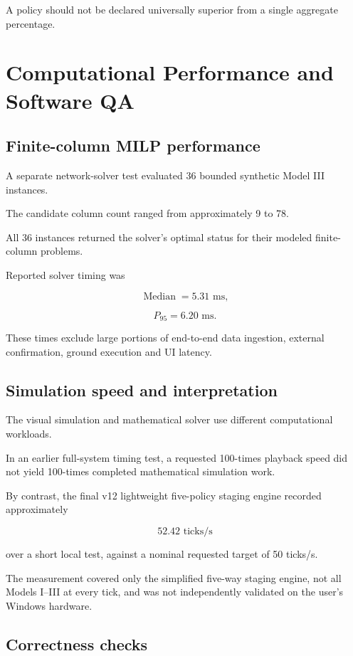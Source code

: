 \documentclass[10pt,a4paper]{article}
\theoremstyle{plain}
\theoremstyle{definition}
\theoremstyle{remark}
\begin{document}
A policy should not be declared
universally superior from
a single aggregate percentage.

\section{Computational Performance and Software QA}

\subsection{Finite-column MILP performance}

A separate network-solver test
evaluated 36 bounded synthetic
Model III instances.

The candidate column count
ranged from approximately
9 to 78.

All 36 instances returned the
solver's optimal status
for their modeled finite-column problems.

Reported solver timing was

\[
\operatorname{Median}=5.31\text{ ms},
\]

\[
P_{95}=6.20\text{ ms}.
\]

These times exclude
large portions of end-to-end
data ingestion,
external confirmation,
ground execution and UI latency.

\subsection{Simulation speed and interpretation}

The visual simulation and mathematical
solver use different computational workloads.

In an earlier full-system timing test,
a requested 100-times playback speed
did not yield 100-times
completed mathematical simulation work.

By contrast, the final v12
lightweight five-policy staging engine
recorded approximately

\[
52.42\text{ ticks/s}
\]

over a short local test,
against a nominal requested target
of 50 ticks/s.

The measurement covered only
the simplified five-way staging engine,
not all Models I--III at every tick,
and was not independently
validated on the user's Windows hardware.

\subsection{Correctness checks}
\end{document}
